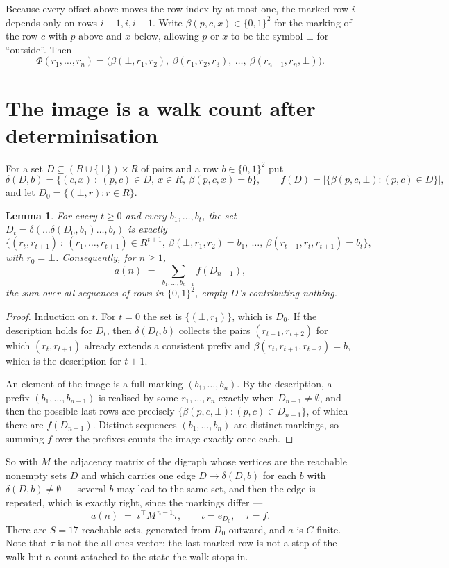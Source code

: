 \documentclass[11pt,a4paper]{article}
\theoremstyle{plain}
\newtheorem{lemma}[theorem]{Lemma}
\theoremstyle{definition}
\begin{document}
Because every offset above moves the row index by at most one, the marked row $i$ depends only
on rows $i-1,i,i+1$. Write $\beta(p,c,x)\in\{0,1\}^{2}$ for the marking of the row $c$
with $p$ above and $x$ below, allowing $p$ or $x$ to be the symbol $\bot$ for ``outside''.
Then
\[
\Phi(r_1,\dots,r_n)=\bigl(\beta(\bot,r_1,r_2),\ \beta(r_1,r_2,r_3),\ \dots,\
\beta(r_{n-1},r_n,\bot)\bigr).
\]

\section{The image is a walk count after determinisation}

For a set $D\subseteq(R\cup\{\bot\})\times R$ of pairs and a row $b\in\{0,1\}^{2}$ put
\[
\delta(D,b)=\{(c,x)\ :\ (p,c)\in D,\ x\in R,\ \beta(p,c,x)=b\},\qquad
f(D)=\bigl|\{\beta(p,c,\bot):(p,c)\in D\}\bigr| ,
\]
and let $D_0=\{(\bot,r):r\in R\}$.

\begin{lemma}\label{lem:det}
For every $t\ge0$ and every $b_1,\dots,b_t$, the set
$D_t=\delta(\dots\delta(D_0,b_1)\dots,b_t)$ is exactly
\[
\{(r_t,r_{t+1})\ :\ (r_1,\dots,r_{t+1})\in R^{t+1},\ \beta(\bot,r_1,r_2)=b_1,\ \dots,\
\beta(r_{t-1},r_t,r_{t+1})=b_t\} ,
\]
with $r_0=\bot$. Consequently, for $n\ge1$,
\[
a(n)\;=\;\sum_{b_1,\dots,b_{n-1}}f(D_{n-1}),
\]
the sum over all sequences of rows in $\{0,1\}^{2}$, empty $D$'s contributing nothing.
\end{lemma}

\begin{proof}
Induction on $t$. For $t=0$ the set is $\{(\bot,r_1)\}$, which is $D_0$. If the description
holds for $D_t$, then $\delta(D_t,b)$ collects the pairs $(r_{t+1},r_{t+2})$ for which
$(r_t,r_{t+1})$ already extends a consistent prefix and
$\beta(r_t,r_{t+1},r_{t+2})=b$, which is the description for $t+1$.

An element of the image is a full marking $(b_1,\dots,b_n)$. By the description, a prefix
$(b_1,\dots,b_{n-1})$ is realised by some $r_1,\dots,r_n$ exactly when $D_{n-1}\neq
\emptyset$, and then the possible last rows are precisely
$\{\beta(p,c,\bot):(p,c)\in D_{n-1}\}$, of which there are $f(D_{n-1})$. Distinct
sequences $(b_1,\dots,b_n)$ are distinct markings, so summing $f$ over the prefixes counts the
image exactly once each.
\end{proof}

So with $M$ the adjacency matrix of the digraph whose vertices are the reachable nonempty sets
$D$ and which carries one edge $D\to\delta(D,b)$ for each $b$ with $\delta(D,b)\neq\emptyset$
--- several $b$ may lead to the same set, and then the edge is repeated, which is exactly
right, since the markings differ ---
\[
a(n)\;=\;\iota^{\!\top}M^{\,n-1}\tau,\qquad \iota=e_{D_0},\quad \tau=f .
\]
There are $S=17$ reachable sets, generated from $D_0$ outward, and $a$ is $C$-finite. Note
that $\tau$ is not the all-ones vector: the last marked row is not a step of the walk but a
count attached to the state the walk stops in.
\end{document}
